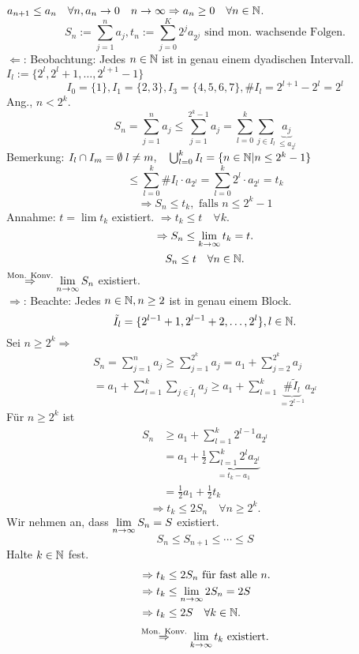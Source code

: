 \documentclass[../ana1.tex]{subfiles}
\begin{document}
\begin{bew}
	\( a_{n+1} \leq a_n \quad\forall n, a_n\rightarrow0 \quad n \rightarrow\infty \Rightarrow a_n \geq 0 \quad\forall n\in\mathbb{N} \).
	\[ S_n := \sum_{j=1}^{n}a_j, t_n := \sum_{j=0}^{K}2^j a_{2^j} \text{ sind mon.\ wachsende Folgen.} \]
	\glqq{}\(\Leftarrow{}\)\grqq{}: Beobachtung: Jedes \(n\in\mathbb{N} \) ist in genau einem \glqq{}dyadischen\grqq{} Intervall. \( I_l := \{ 2^l, 2^l + 1, \dots, 2^{l+1} - 1 \} \)
	\[ I_0 = \{1\}, I_1 = \{2,3\}, I_3 = \{4,5,6,7\}, \#I_l = 2^{l+1} - 2^l = 2^l \]
	Ang., \(n<2^k\). 
	\[ S_n = \sum_{j=1}^{n}a_j \leq \sum_{j=1}^{2^k - 1}a_j = \sum_{l=0}^{k}\sum_{j\in I_l} \underbrace{a_j}_{\leq a_{2^l}} \]
	Bemerkung: \(I_l \cap I_m = \emptyset \; l \neq m, \quad \bigcup_{l=0}^{k} I_l = \{n \in \mathbb{N} | n \leq 2^k -1\} \)
	\[\leq \sum_{l=0}^{k} \#I_l \cdot a_{2^l} = \sum_{l=0}^{k} 2^l \cdot a_{2^l} = t_k\]
	\[ \Rightarrow S_n \leq t_k, \text{ falls } n\leq 2^k - 1 \]
	Annahme: \( t = \lim t_k \) existiert. \( \Rightarrow t_k \leq t \quad\forall k \).
	\[ \Rightarrow S_n \leq \lim\limits_{k\rightarrow\infty}t_k = t. \]
	\[S_n \leq t \quad\forall n\in\mathbb{N}.\]
	\( \overset{\text{Mon. Konv.}}{\Rightarrow} \lim\limits_{n\rightarrow\infty} S_n \) existiert. \checkmark{}\\
	\glqq{}\(\Rightarrow \)\grqq{}: Beachte: Jedes \(n \in\mathbb{N}, n\geq 2 \) ist in genau einem Block.
	\[ \tilde{I}_l = \{ 2^{l-1} + 1, 2^{l-1} + 2, \dots, 2^l \}, l\in\mathbb{N}. \]
	Sei \(n \geq 2^k \Rightarrow \)
	\begin{align*}
		S_n = \sum_{j=1}^{n}a_j \geq \sum_{j=1}^{2^k}a_j = a_1 + \sum_{j=2}^{2^k} a_j\\
		= a_1 + \sum_{l=1}^{k}\sum_{j\in\tilde{I}_l} a_j \geq a_1 + \sum_{l=1}^{k} \underbrace{\# \tilde{I}_l}_{=2^{l-1}} a_{2^l}
	\end{align*}
	Für \(n \geq 2^k \) ist
	\begin{align*}
		S_n &\geq a_1 + \sum_{l=1}^{k} 2^{l-1}a_{2^l}\\
		&=a_1 + \frac{1}{2} \underbrace{ \sum_{l=1}^{k}2^l a_{2^l} }_{=t_k - a_1}\\
		&= \frac{1}{2}a_1 + \frac{1}{2}t_k
	\end{align*}
	\[ \Rightarrow t_k \leq 2S_n \quad\forall n\geq 2^k. \]
	Wir nehmen an, dass \( \lim\limits_{n\rightarrow\infty}S_n = S \) existiert.
	\[ S_n \leq S_{n+1} \leq \cdots \leq S \]
	Halte \( k\in\mathbb{N} \) fest.
	\begin{align*}
		&\Rightarrow t_k \leq 2S_n \text{ für fast alle } n.\\
		&\Rightarrow t_k \leq \lim\limits_{n\rightarrow\infty} 2S_n = 2S\\
		&\Rightarrow t_k \leq 2S \quad\forall k\in\mathbb{N}.
	\end{align*}
	\[ \overset{\text{Mon. Konv.}}{\Rightarrow}\lim\limits_{k\rightarrow\infty}t_k \text{ existiert.} \]
\end{bew}
\end{document}
